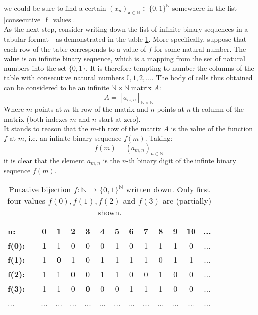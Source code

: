 \documentclass[12pt]{article}
\theoremstyle{plain}
\theoremstyle{definition}
\begin{document}
we could be sure to find a certain 
$(x_n)_{n \in \mathbb{N}} \in \{ 0, 1 \}^{\mathbb{N}}$ 
somewhere in the list \eqref{consecutive_f_values}. \\
\indent As the next step, consider writing down the list of infinite binary sequences 
in a tabular format - as demonstrated in the table
\ref{tab:diagonal-arg-standard}. More specifically, suppose that each row of the table
 corresponds to a value of $f$ for some natural number. The value is an infinite binary 
 sequence, which is a mapping from the set of natural numbers into the set $\{ 0, 1 \}$.
  It is therefore tempting to number the columns of the table with consecutive natural
  numbers $0, 1, 2, ...$. The body of cells thus obtained can be considered
  to be an infinite $\mathbb{N} \times \mathbb{N}$ matrix $A$:
  $$A = [a_{m, n}]_{\mathbb{N} \times \mathbb{N}}$$
 Where $m$ points at $m$-th row of the matrix and $n$ points at $n$-th column of 
  the matrix (both indexes $m$ and $n$ start at zero).
\\ \indent It stands to reason that the $m$-th row of the matrix $A$ is the value 
of the function $f$ at $m$, i.e. an infinite binary sequence $f(m)$. 
Taking:
$$ f(m) = (a_{m, n})_{n \in \mathbb{N}} $$
it is clear that the element $a_{m ,n}$ is the $n$-th binary digit of the 
infinte binary sequence $f(m)$.

\begin{table}[]
\centering
\begin{tabular}{llcccccccccccc}
\textbf{n:} &
  \textbf{} &
  \textbf{0} &
  \textbf{1} &
  \textbf{2} &
  \textbf{3} &
  \textbf{4} &
  \textbf{5} &
  \textbf{6} &
  \textbf{7} &
  \textbf{8} &
  \textbf{9} &
  \textbf{10} &
  \textbf{...} \\ \cline{1-13}
\textbf{f(0):} &  & \textbf{1} & 1          & 0          & 0          & 0   & 1   & 0   & 1   & 1   & 1   & 0   & ... \\
\textbf{f(1):} &  & 1          & \textbf{0} & 1          & 0          & 1   & 1   & 1   & 1   & 0   & 1   & 1   & ... \\
\textbf{f(2):} &  & 1          & 1          & \textbf{0} & 0          & 1   & 1   & 0   & 0   & 1   & 0   & 0   & ... \\
\textbf{f(3):} &  & 1          & 1          & 0          & \textbf{0} & 0   & 0   & 1   & 1   & 1   & 0   & 0   & ... \\
...            &  & ...        & ...        & ...        & ...        & ... & ... & ... & ... & ... & ... & ... & ...
\end{tabular}
\caption{Putative bijection 
$f: \mathbb{N} \longrightarrow \{0, 1\}^{\mathbb{N}} $ written down.
Only first four values $f(0), f(1), f(2)$ and $f(3)$ 
are (partially) shown. }
\label{tab:diagonal-arg-standard}
\end{table}
\end{document}
